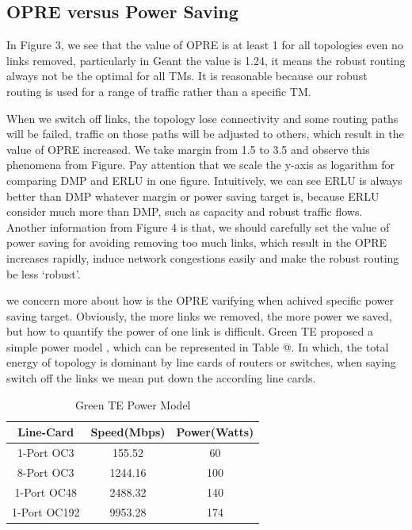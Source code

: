 \documentclass[conference]{IEEEtran}
\makeatletter
\newcommand{\Rmnum}[1]{\expandafter\@slowromancap\romannumeral #1@}
\makeatother
\begin{document}
\subsection{OPRE versus Power Saving}
In Figure 3, we see that the value of OPRE is at least 1 for all topologies even no links removed, particularly in Geant the value is 1.24,
it means the robust routing always not be the optimal for all TMs. It is reasonable because our robust routing is used for a range of traffic 
rather than a specific TM.


When we switch off links, the topology lose connectivity and some routing paths will be failed, traffic on those paths will be 
adjusted to others, which result in the value of OPRE increased. We take margin from 1.5 to 3.5 and observe this phenomena from Figure.
Pay attention that we scale the y-axis as logarithm for comparing DMP and ERLU in one figure. Intuitively, we can see ERLU is always
better than DMP whatever margin or power saving target is, because ERLU consider much more than DMP, such as capacity and robust traffic 
flows. Another information from Figure 4 is that, we should carefully set the value of power saving for avoiding removing too much
links, which result in the OPRE increases rapidly, induce network congestions easily and make the robust routing be less `robust'.


we concern more about how is the OPRE varifying when achived specific power saving target. Obviously, the more links we removed, 
the more power we saved, but how to quantify the power of one link is difficult. Green TE proposed a simple power model \cite{networking:greente}, 
which can be represented in Table \Rmnum{2}. In which, the total energy of topology is dominant by line cards of routers or switches, 
when saying switch off the links we mean put down the according line cards.

\begin{table}[!t]
\renewcommand{\arraystretch}{1}
\caption{Green TE Power Model}
\label{power model}
\centering
\begin{tabular}{|c|c|c|}
\hline
\bfseries Line-Card & \bfseries Speed(Mbps) & \bfseries Power(Watts) \\
\hline
1-Port OC3 & 155.52 & 60 \\
\hline
8-Port OC3 & 1244.16 & 100 \\
\hline
1-Port OC48 & 2488.32 & 140 \\
\hline
1-Port OC192 & 9953.28 & 174 \\
\hline
\end{tabular}
\end{table}
\end{document}
